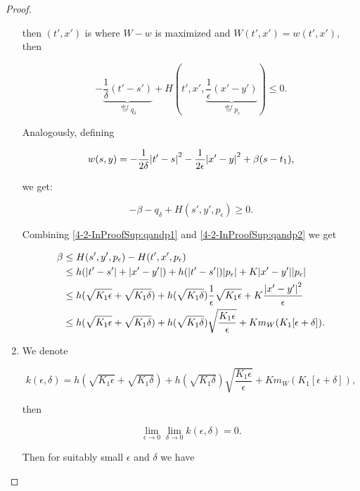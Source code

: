 \begin{proof}
\begin{enumerate}
        then $(t',x')$ is where $W-w$ is maximized and $W(t',x')=w(t',x')$, then

        \begin{equation}\label{4-2-InProofSup:qandp1}-\underbrace{\frac{1}{\delta}(t'-s')}_{\overset{def}{=}q_{\delta}} + H(t',x',\underbrace{\frac{1}{\epsilon}(x'-y')}_{\overset{def}{=}p_{\epsilon}})\leq0.\end{equation}

        Analogously, defining 

        \[w(s,y) = -\frac{1}{2\delta}\abs{t'-s}^2 - \frac{1}{2\epsilon}\abs{x'-y}^2 + \beta(s-t_1),\]

        we get:

        \begin{equation}\label{4-2-InProofSup:qandp2}
            -\beta-q_{\delta}+H(s',y',p_{\epsilon})\geq0.
        \end{equation}

        Combining \ref{4-2-InProofSup:qandp1} and \ref{4-2-InProofSup:qandp2} we get

        \begin{align*}
            \beta & \leq H(s',y',p_{\epsilon}) - H(t',x',p_{\epsilon}) \\
            & \leq h(\abs{t'-s'} + \abs{x'-y'}) + h(\abs{t'-s'})\abs{p_{\epsilon}} + K\abs{x'-y'}\abs{p_{\epsilon}} \\
            & \leq h(\sqrt{K_1\epsilon} + \sqrt{K_1\delta}) + h(\sqrt{K_1\delta})\frac{1}{\epsilon}\sqrt{K_1\epsilon} + K\frac{\abs{x'-y'}^2}{\epsilon} \\
            & \leq h(\sqrt{K_1\epsilon} + \sqrt{K_1\delta}) + h(\sqrt{K_1\delta})\sqrt{\frac{K_1\epsilon}{\epsilon}} + Km_W(K_1[\epsilon+\delta]).
        \end{align*}
        
        \item We denote
        
        \begin{equation}\label{4-2-inproofSup:k}
            k(\epsilon,\delta) = h(\sqrt{K_1\epsilon} + \sqrt{K_1\delta}) + h(\sqrt{K_1\delta})\sqrt{\frac{K_1\epsilon}{\epsilon}} + Km_W(K_1[\epsilon+\delta]),
        \end{equation}

        then

        \[\lim_{\epsilon\to0}\lim_{\delta\to0} k(\epsilon,\delta) = 0.\]

        Then for suitably small $\epsilon$ and $\delta$ we have


\end{enumerate}
\end{proof}
